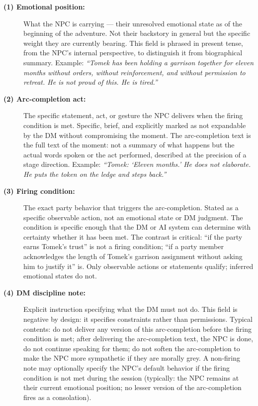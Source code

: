 \begin{description}
  \item[\textbf{(1) Emotional position:}]
    What the NPC is carrying --- their unresolved emotional state as of
    the beginning of the adventure. Not their backstory in general but
    the specific weight they are currently bearing. This field is phrased
    in present tense, from the NPC's internal perspective, to distinguish
    it from biographical summary. Example: \textit{``Tomek has been holding
    a garrison together for eleven months without orders, without
    reinforcement, and without permission to retreat. He is not proud of
    this. He is tired.''}

  \item[\textbf{(2) Arc-completion act:}]
    The specific statement, act, or gesture the NPC delivers when the
    firing condition is met. Specific, brief, and explicitly marked as
    not expandable by the DM without compromising the moment. The
    arc-completion text is the full text of the moment: not a summary of
    what happens but the actual words spoken or the act performed,
    described at the precision of a stage direction. Example:
    \textit{``Tomek: `Eleven months.' He does not elaborate. He puts the
    token on the ledge and steps back.''}

  \item[\textbf{(3) Firing condition:}]
    The exact party behavior that triggers the arc-completion. Stated as
    a specific observable action, not an emotional state or DM judgment.
    The condition is specific enough that the DM or AI system can determine
    with certainty whether it has been met. The contrast is critical: ``if
    the party earns Tomek's trust'' is not a firing condition; ``if a party
    member acknowledges the length of Tomek's garrison assignment without
    asking him to justify it'' is. Only observable actions or statements
    qualify; inferred emotional states do not.

  \item[\textbf{(4) DM discipline note:}]
    Explicit instruction specifying what the DM must not do. This field is
    negative by design: it specifies constraints rather than permissions.
    Typical contents: do not deliver any version of this arc-completion
    before the firing condition is met; after delivering the arc-completion
    text, the NPC is done, do not continue speaking for them; do not soften
    the arc-completion to make the NPC more sympathetic if they are morally
    grey. A non-firing note may optionally specify the NPC's default
    behavior if the firing condition is not met during the session (typically:
    the NPC remains at their current emotional position; no lesser version
    of the arc-completion fires as a consolation).
\end{description}


